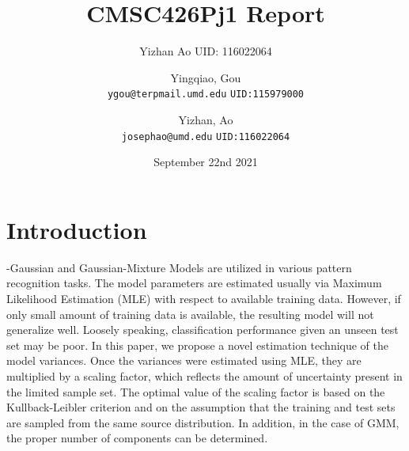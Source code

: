 \documentclass{article}
\title{CMSC426Pj1 Report}
\author{Yizhan Ao UID: 116022064}
\author{
  Yingqiao, Gou\\
  \texttt{ygou@terpmail.umd.edu}
  \texttt{UID:115979000}
  \and
  Yizhan, Ao\\
  \texttt{josephao@umd.edu}
  \texttt{UID:116022064}
}
\date{September 22nd 2021}
\begin{document}
\maketitle

\section{Introduction}
\begin{enumerate}
    \paragraphSingle-Gaussian and Gaussian-Mixture Models are utilized in various pattern recognition tasks. The model parameters are estimated usually via Maximum Likelihood Estimation (MLE) with respect to available training data. However, if only small amount of training data is available, the resulting model will not generalize well. Loosely speaking, classification performance given an unseen test set may be poor. In this paper, we propose a novel estimation technique of the model variances. Once the variances were estimated using MLE, they are multiplied by a scaling factor, which reflects the amount of uncertainty present in the limited sample set. The optimal value of the scaling factor is based on the Kullback-Leibler criterion and on the assumption that the training and test sets are sampled from the same source distribution. In addition, in the case of GMM, the proper number of components can be determined.
\end{enumerate}
\end{document}
